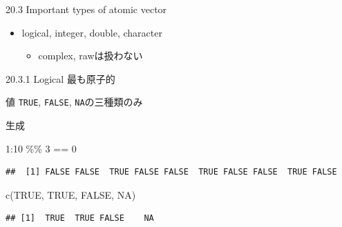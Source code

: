 \documentclass[
  ignorenonframetext,
]{beamer}
\newenvironment{Shaded}{\begin{snugshade}}{\end{snugshade}}
\newcommand{\ConstantTok}[1]{\textcolor[rgb]{0.00,0.00,0.00}{#1}}
\newcommand{\DecValTok}[1]{\textcolor[rgb]{0.00,0.00,0.81}{#1}}
\newcommand{\FunctionTok}[1]{\textcolor[rgb]{0.00,0.00,0.00}{#1}}
\newcommand{\NormalTok}[1]{#1}
\newcommand{\SpecialCharTok}[1]{\textcolor[rgb]{0.00,0.00,0.00}{#1}}
\providecommand{\tightlist}{%
  \setlength{\itemsep}{0pt}\setlength{\parskip}{0pt}}
\begin{document}
\begin{frame}{20.3 Important types of atomic vector}
\protect\hypertarget{important-types-of-atomic-vector}{}
\begin{itemize}
\tightlist
\item
  logical, integer, double, character

  \begin{itemize}
  \tightlist
  \item
    complex, rawは扱わない
  \end{itemize}
\end{itemize}
\end{frame}

\begin{frame}[fragile]{20.3.1 Logical}
\protect\hypertarget{logical}{}
最も原子的

\begin{block}{値}
\protect\hypertarget{ux5024}{}
\texttt{TRUE}, \texttt{FALSE}, \texttt{NA}の三種類のみ
\end{block}

\begin{block}{生成}
\protect\hypertarget{ux751fux6210}{}
\begin{Shaded}
\begin{Highlighting}[]
\DecValTok{1}\SpecialCharTok{:}\DecValTok{10} \SpecialCharTok{\%\%} \DecValTok{3} \SpecialCharTok{==} \DecValTok{0}
\end{Highlighting}
\end{Shaded}

\begin{verbatim}
##  [1] FALSE FALSE  TRUE FALSE FALSE  TRUE FALSE FALSE  TRUE FALSE
\end{verbatim}

\begin{Shaded}
\begin{Highlighting}[]
\FunctionTok{c}\NormalTok{(}\ConstantTok{TRUE}\NormalTok{, }\ConstantTok{TRUE}\NormalTok{, }\ConstantTok{FALSE}\NormalTok{, }\ConstantTok{NA}\NormalTok{)}
\end{Highlighting}
\end{Shaded}

\begin{verbatim}
## [1]  TRUE  TRUE FALSE    NA
\end{verbatim}
\end{block}
\end{frame}
\end{document}
